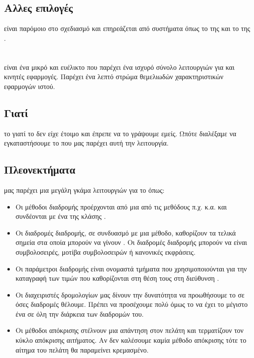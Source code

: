 \subsection*{Αλλες επιλογές}
  είναι παρόμοιο στο σχεδιασμό και επηρεάζεται από συστήματα όπως το  της  και το  της .

\section{}
  είναι ένα μικρό και ευέλικτο  που παρέχει ένα ισχυρό σύνολο λειτουργιών για  και κινητές εφαρμογές. Παρέχει ένα λεπτό στρώμα θεμελιωδών χαρακτηριστικών εφαρμογών ιστού.

\subsection*{Γιατί}
 το  γιατί το  δεν είχε έτοιμο  και έπρεπε να το γράψουμε εμείς. Ωπότε διαλέξαμε να εγκαταστήσουμε το  που μας παρέχει αυτή την λειτουργία. 

\subsection*{Πλεονεκτήματα}
  μας παρέχει μια μεγάλη γκάμα λειτουργιών για το  όπως:
\begin{itemize}
    \item {}
        Οι μέθοδοι διαδρομής προέρχονται από μια από τις μεθόδους  π.χ.  κ.α. και συνδέονται με ένα  της κλάσης .
    \item {}
        Οι διαδρομές διαδρομής, σε συνδυασμό με μια  μέθοδο, καθορίζουν τα τελικά σημεία στα οποία μπορούν να γίνουν . Οι διαδρομές διαδρομής μπορούν να είναι συμβολοσειρές, μοτίβα συμβολοσειρών ή κανονικές εκφράσεις.
    \item {}
        Οι παράμετροι διαδρομής είναι ονομαστά τμήματα  που χρησιμοποιούνται για την καταγραφή των τιμών που καθορίζονται στη θέση τους στη διεύθυνση .
    \item {}
        Οι διαχειριστές δρομολογίων μας δίνουν την δυνατότητα να προωθήσουμε το  σε όσες διαδρομές θέλουμε. Πρέπει να προσέχουμε πολύ όμως το  να έχει το μέγιστο ένα  σε όλη την διάρκεια των διαδρομών του.
    \item {}
        Οι μέθοδοι απόκρισης στέλνουν μια απάντηση στον πελάτη και τερματίζουν τον κύκλο απόκρισης αιτήματος. Αν δεν καλέσουμε καμία μέθοδο απόκρισης τότε το αίτημα του πελάτη θα παραμείνει κρεμασμένο.
\end{itemize}
 
